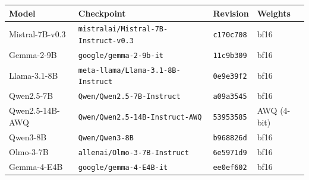 \begin{tabular}{llll}
\toprule
Model & Checkpoint & Revision & Weights \\
\midrule
Mistral-7B-v0.3 & \texttt{mistralai/Mistral-7B-Instruct-v0.3} & \texttt{c170c708} & bf16 \\
Gemma-2-9B & \texttt{google/gemma-2-9b-it} & \texttt{11c9b309} & bf16 \\
Llama-3.1-8B & \texttt{meta-llama/Llama-3.1-8B-Instruct} & \texttt{0e9e39f2} & bf16 \\
Qwen2.5-7B & \texttt{Qwen/Qwen2.5-7B-Instruct} & \texttt{a09a3545} & bf16 \\
Qwen2.5-14B-AWQ & \texttt{Qwen/Qwen2.5-14B-Instruct-AWQ} & \texttt{53953585} & AWQ (4-bit) \\
Qwen3-8B & \texttt{Qwen/Qwen3-8B} & \texttt{b968826d} & bf16 \\
Olmo-3-7B & \texttt{allenai/Olmo-3-7B-Instruct} & \texttt{6e5971d9} & bf16 \\
Gemma-4-E4B & \texttt{google/gemma-4-E4B-it} & \texttt{ee0ef602} & bf16 \\
\bottomrule
\end{tabular}
